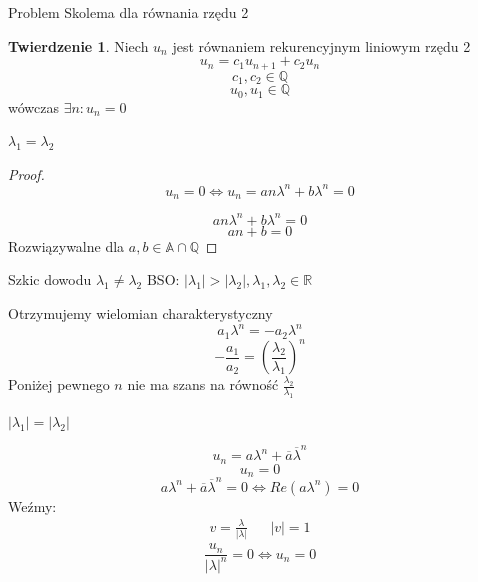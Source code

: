 \documentclass[handout]{beamer}
\def\Q{\mathbb{Q}}
\def\A{\mathbb{A}}
\theoremstyle{definition}
\newtheorem*{twierdzenie}{Twierdzenie}
\theoremstyle{named}
\begin{document}
\begin{frame}{Problem Skolema dla równania rzędu 2}


\begin{twierdzenie}
    Niech $u_n$ jest równaniem rekurencyjnym liniowym rzędu 2
    $$
        u_n = c_1 u_{n+1} + c_2 u_n
    $$
    $$
        c_1, c_2 \in \mathbb{Q}
    $$
    $$
        u_0, u_1 \in \mathbb{Q}
    $$
    wówczas $\exists n : u_n = 0$
\end{twierdzenie}

\end{frame}

\begin{frame}{$\lambda_1= \lambda_2$}

\begin{proof}
    $$u_n = 0 \iff  u_n = a n \lambda^{n} + b \lambda^{n} = 0$$
    
    $$ a n \lambda^{n} + b \lambda^{n} = 0 $$
    $$ a n + b = 0 $$
    Rozwiązywalne dla $a, b \in \A \cap \Q $
\end{proof}

    
\end{frame}

\begin{frame}{Szkic dowodu $\lambda_1 \neq \lambda_2$}
    BSO: 
    $|\lambda_1| > |\lambda_2|, \lambda_1, \lambda_2 \in \mathbb{R}$
    
    Otrzymujemy wielomian charakterystyczny 
    $$
       a_1 \lambda^{n} = - a_2 \lambda^{n}
    $$
    $$
        - \frac{a_1}{a_2} = (\frac{\lambda_2}{\lambda_1})^{n}
    $$
    Poniżej pewnego $n$ nie ma szans na równość $\frac{\lambda_2}{\lambda_1}$
\end{frame}

\begin{frame}{$|\lambda_1| = |\lambda_2|$}

\begin{equation*}
    u_n = a \lambda^{n} + \overline{a} \overline{\lambda}^{n} 
\end{equation*}
\pause 
\begin{equation*}
    u_n = 0 
\end{equation*}
\pause 
\begin{equation*}
    a \lambda^{n} + \overline{a} \overline{\lambda}^{n} = 0 \iff Re(a {\lambda^{n}}) = 0 
\end{equation*} 
\pause
Weźmy: 
\begin{align*}
    v = \frac{\lambda}{|\lambda|} && |v| = 1
\end{align*}
$$\frac{u_n}{|\lambda|^{n}} = 0 \iff u_n = 0$$

\end{frame}
    
\end{document}
